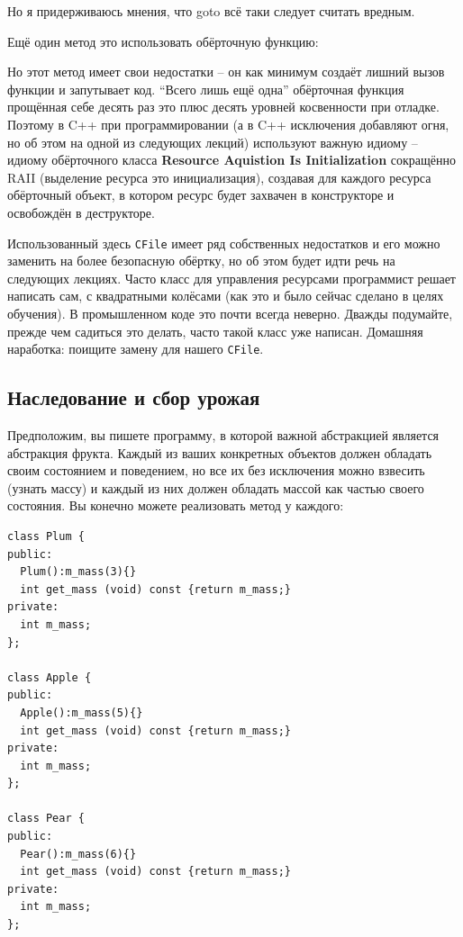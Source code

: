 \documentclass[a4paper,12pt,oneside]{article}
\begin{document}


Но я придерживаюсь мнения, что goto всё таки следует считать вредным. 

Ещё один метод это использовать обёрточную функцию:



Но этот метод имеет свои недостатки – он как минимум создаёт лишний вызов функции и запутывает код. ``Всего лишь ещё одна'' обёрточная функция прощённая себе десять раз это плюс десять уровней косвенности при отладке.
Поэтому в C++ при программировании (а в C++ исключения добавляют огня, но об этом на одной из следующих лекций) используют важную идиому – идиому обёрточного класса \textbf{Resource Aquistion Is Initialization} сокращённо RAII (выделение ресурса это инициализация), создавая для каждого ресурса обёрточный объект, в котором ресурс будет захвачен в конструкторе и освобождён в деструкторе.



Использованный здесь \lstinline!CFile! имеет ряд собственных недостатков и его можно заменить на более безопасную обёртку, но об этом будет идти речь на следующих лекциях. Часто класс для управления ресурсами программист решает написать сам, с квадратными колёсами (как это и было сейчас сделано в целях обучения). В промышленном коде это почти всегда неверно. Дважды подумайте, прежде чем садиться это делать, часто такой класс уже написан.
Домашняя наработка: поищите замену для нашего \lstinline!CFile!.

\subsection{Наследование и сбор урожая}

Предположим, вы пишете программу, в которой важной абстракцией является абстракция фрукта. Каждый из ваших конкретных объектов должен обладать своим состоянием и поведением, но все их без исключения можно взвесить (узнать массу) и каждый из них должен обладать массой как частью своего состояния. Вы конечно можете реализовать метод у каждого:

\begin{lstlisting}
class Plum {
public:
  Plum():m_mass(3){}
  int get_mass (void) const {return m_mass;}
private:
  int m_mass;
};

class Apple {
public:
  Apple():m_mass(5){}
  int get_mass (void) const {return m_mass;}
private:
  int m_mass;
};

class Pear {
public:
  Pear():m_mass(6){}
  int get_mass (void) const {return m_mass;}
private:
  int m_mass;
};
\end{lstlisting}
\end{document}
